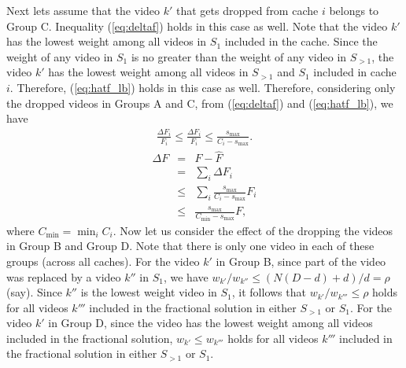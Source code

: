 \documentclass[conference]{IEEEtran}
\begin{document}
Next lets assume that the video $k'$  that gets dropped from cache $i$ belongs to Group C. Inequality (\ref{eq:deltaf}) holds in this case as well. Note that the video $k'$ has the lowest weight among all videos in $S_1$ included in the cache. Since the weight of any video in $S_1$ is no greater than the weight of any video in $S_{>1}$, the video $k'$ has the lowest weight among all videos in $S_{>1}$ and $S_1$ included in cache $i$. Therefore, (\ref{eq:hatf_lb}) holds in this case as well. Therefore, considering only the dropped videos in Groups A and C, from (\ref{eq:deltaf}) and (\ref{eq:hatf_lb}), we have 
\begin{eqnarray}
\frac{\Delta F_i}{F_i} \leq \frac{\Delta F_i}{F_i} \leq \frac{s_{\max}}{C_i-s_{\max}}.
\label{eq:deltaf_f_ratio}
\end{eqnarray}
\begin{eqnarray}
\Delta F & = & F - \hat{F} \nonumber\\
& = & \sum_i \Delta F_i \nonumber\\
& \leq & \sum_i \frac{s_{\max}}{C_i-s_{\max}} F_i \nonumber\\
& \leq & \frac{s_{\max}}{C_{\min}-s_{\max}} F,\label{eq:deltaf_total}
\end{eqnarray}
where $C_{\min} = \min_i C_i$. Now let us consider the effect of the dropping the videos in Group B and Group D. Note that there is only one video in each of these groups (across all caches). For the video $k'$ in Group B, since part of the video was replaced by a video $k''$ in $S_1$, we have $w_{k'}/w_{k''} \leq (N(D-d)+d)/d = \rho$ (say). Since $k''$ is the lowest weight video in $S_1$, it follows that $w_{k'}/w_{k'''} \leq \rho$ holds for all videos $k'''$ included in the fractional solution in either $S_{>1}$ or $S_1$. For the video $k'$ in Group D, since the video has the lowest weight among all videos included in the fractional solution, $w_{k'} \leq w_{k'''}$ holds for all videos $k'''$ included in the fractional solution in either $S_{>1}$ or $S_1$.
\end{document}
